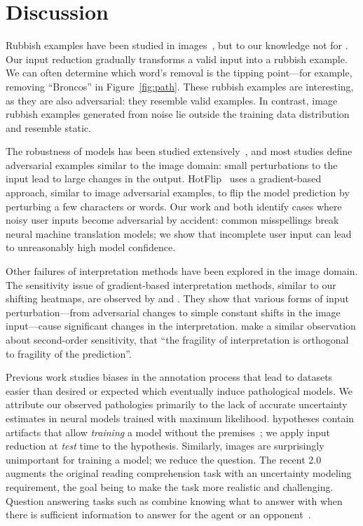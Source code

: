\section{Discussion}
\label{sec:discussion}

Rubbish examples have been studied in images~\cite{goodfellow2014explaining, nguyen2015fooled}, but to our knowledge not
for \nlp{}.  Our input reduction gradually transforms a valid input
into a rubbish example. We can often determine which word's removal
is the tipping point---for example, removing ``Broncos'' in
Figure~\ref{fig:path}.  These rubbish examples are
 interesting, as they are also adversarial: they resemble valid
 examples.  In contrast, image rubbish examples
generated from noise lie outside the training data
distribution and resemble static.

The robustness of \nlp{} models has been studied
extensively~\cite{papernot2016crafting, jia2017adversarial,
iyyer2018scpn,ribeiro2018semantically},
and most studies define adversarial examples similar to the image domain: small
perturbations to the input lead to large changes in the output.
HotFlip~\cite{ebrahimi2017hotflip} uses a gradient-based approach,
similar to image adversarial examples, to flip the model prediction by
perturbing a few characters or words.
Our work and \citet{belinkov2017synthetic} both identify cases where noisy
user inputs become adversarial by accident: common misspellings break neural
machine translation models; we show that incomplete user input can lead to
unreasonably high model confidence.

Other failures of interpretation methods have been explored in the image
domain. The sensitivity issue of gradient-based interpretation methods,
similar to our shifting heatmaps, are observed by
\citet{ghorbani2017interpretation} and \citet{kindermans2017unreliability}. They
show that various forms of input perturbation---from adversarial changes to simple
constant shifts in the image input---cause significant changes in the
interpretation. \citet{ghorbani2017interpretation} make a similar observation
about second-order sensitivity, that ``the fragility of interpretation is
orthogonal to fragility of the prediction''.

Previous work studies biases in the annotation process that lead to
datasets easier than desired or expected which eventually induce
pathological models. We attribute our observed pathologies primarily
to the lack of accurate uncertainty estimates in neural models trained
with maximum likelihood.  \snli{} hypotheses contain artifacts that
allow \emph{training} a model without the
premises~\cite{gururangan2018annotation}; we apply input reduction at
\emph{test} time to the hypothesis. Similarly, \vqa{} images are
surprisingly unimportant for training a model; we reduce the
question. The recent \squad{} 2.0~\cite{rajpurkar2018know} augments
the original reading comprehension task with an uncertainty modeling
requirement, the goal being to make the task more realistic and
challenging.  Question answering tasks such as \qb{} combine
knowing what to answer with when there is sufficient information to
answer for the agent or an opponent~\cite{He-16:opponent}.

